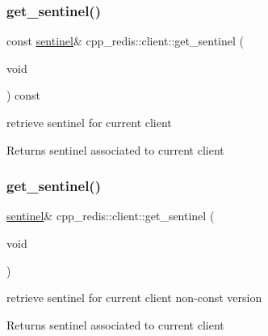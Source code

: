 \mbox{\label{classcpp__redis_1_1client_a9f94860dad26bca4e860a56ca8aefe36}} 
\subsubsection{\texorpdfstring{get\+\_\+sentinel()}{get\_sentinel()}\hspace{0.1cm}{\footnotesize\ttfamily [1/2]}}
{\footnotesize\ttfamily const \hyperlink{classcpp__redis_1_1sentinel}{sentinel}\& cpp\+\_\+redis\+::client\+::get\+\_\+sentinel (\begin{DoxyParamCaption}\item[{void}]{ }\end{DoxyParamCaption}) const}

retrieve sentinel for current client

\begin{DoxyReturn}{Returns}
sentinel associated to current client 
\end{DoxyReturn}
\mbox{\label{classcpp__redis_1_1client_a9457cea98f061ce6071f897ba8605813}} 
\subsubsection{\texorpdfstring{get\+\_\+sentinel()}{get\_sentinel()}\hspace{0.1cm}{\footnotesize\ttfamily [2/2]}}
{\footnotesize\ttfamily \hyperlink{classcpp__redis_1_1sentinel}{sentinel}\& cpp\+\_\+redis\+::client\+::get\+\_\+sentinel (\begin{DoxyParamCaption}\item[{void}]{ }\end{DoxyParamCaption})}

retrieve sentinel for current client non-\/const version

\begin{DoxyReturn}{Returns}
sentinel associated to current client 
\end{DoxyReturn}
\mbox{\label{classcpp__redis_1_1client_ad57b10f052814a2a15d4687e34d2be72}} 
